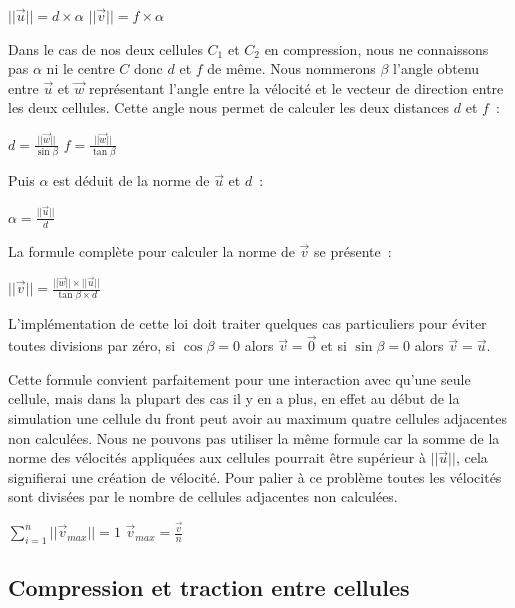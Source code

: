\documentclass[a4paper,10pt]{article}
\begin{document}
\begin{center}
  $||\overrightarrow{u}|| = d \times \alpha$ \medbreak
  $||\overrightarrow{v}|| = f \times \alpha$
\end{center}
Dans le cas de nos deux cellules $C_1$ et $C_2$ en compression, nous ne connaissons pas $\alpha$ ni le centre $C$ donc $d$ et $f$ de même.
Nous nommerons $\beta$ l'angle obtenu entre $\overrightarrow{u}$ et $\overrightarrow{w}$ représentant l'angle entre la vélocité et le vecteur de direction entre les deux cellules.
Cette angle nous permet de calculer les deux distances $d$ et $f$~:
\begin{center}
  $d = \frac{||\overrightarrow{w}||}{\sin{\beta}}$ \medbreak
  $f = \frac{||\overrightarrow{w}||}{\tan{\beta}}$
\end{center}
Puis $\alpha$ est déduit de la norme de $\overrightarrow{u}$ et $d$~:
\begin{center}
  $\alpha = \frac{||\overrightarrow{u}||}{d}$
\end{center}
La formule complète pour calculer la norme de $\overrightarrow{v}$ se présente~:
\begin{center}
  $||\overrightarrow{v}|| = \frac{||\overrightarrow{w}|| \times ||\overrightarrow{u}||}{\tan{\beta} \times d}$
\end{center}
L'implémentation de cette loi doit traiter quelques cas particuliers pour éviter toutes divisions par zéro, si $\cos\beta = 0$ alors $\overrightarrow{v} = \overrightarrow{0}$ et si $\sin\beta = 0$ alors $\overrightarrow{v} = \overrightarrow{u}$.

Cette formule convient parfaitement pour une interaction avec qu'une seule cellule, mais dans la plupart des cas il y en a plus, en effet au début de la simulation une cellule du front peut avoir au maximum quatre cellules adjacentes non calculées.
Nous ne pouvons pas utiliser la même formule car la somme de la norme des vélocités appliquées aux cellules pourrait être supérieur à $||\overrightarrow{u}||$, cela signifierai une création de vélocité.
Pour palier à ce problème toutes les vélocités sont divisées par le nombre de cellules adjacentes non calculées.

\begin{center}
  $\sum_{i=1}^{n} ||\overrightarrow{v}_{max}|| = 1$ \medbreak
  $\overrightarrow{v}_{max} = \frac{\overrightarrow{v}}{n}$
\end{center}

\subsection{Compression et traction entre cellules}
\end{document}
